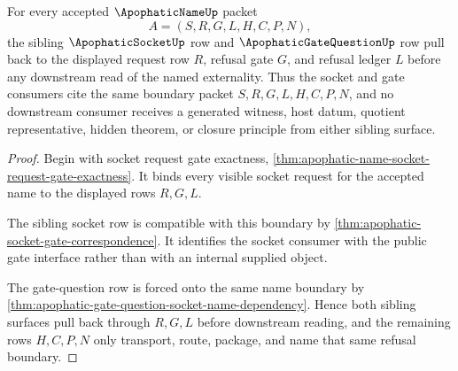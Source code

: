 \begin{theorem}
\label{thm:apophatic-name-socket-gate-ledger-pullback}
For every accepted $\ApophaticNameUp$ packet
$$
A=(S,R,G,L,H,C,P,N),
$$
the sibling $\ApophaticSocketUp$ row and $\ApophaticGateQuestionUp$ row pull back to the displayed request row $R$, refusal gate $G$, and refusal ledger $L$ before any downstream read of the named externality. Thus the socket and gate consumers cite the same boundary packet $S,R,G,L,H,C,P,N$, and no downstream consumer receives a generated witness, host datum, quotient representative, hidden theorem, or closure principle from either sibling surface.
\end{theorem}
\begin{proof}
Begin with socket request gate exactness, \autoref{thm:apophatic-name-socket-request-gate-exactness}. It binds every visible socket request for the accepted name to the displayed rows $R,G,L$.

The sibling socket row is compatible with this boundary by \autoref{thm:apophatic-socket-gate-correspondence}. It identifies the socket consumer with the public gate interface rather than with an internal supplied object.

The gate-question row is forced onto the same name boundary by \autoref{thm:apophatic-gate-question-socket-name-dependency}. Hence both sibling surfaces pull back through $R,G,L$ before downstream reading, and the remaining rows $H,C,P,N$ only transport, route, package, and name that same refusal boundary.
\end{proof}

